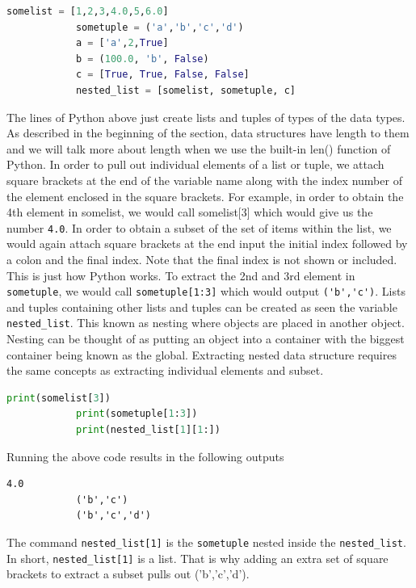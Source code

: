 \documentclass[11pt,a4paper]{book}
\begin{document}
			\begin{lstlisting}[language=Python, caption = Initialization of lists and tuples containing various data types.]
			somelist = [1,2,3,4.0,5,6.0]
			sometuple = ('a','b','c','d')
			a = ['a',2,True]
			b = (100.0, 'b', False)
			c = [True, True, False, False]
			nested_list = [somelist, sometuple, c]
			\end{lstlisting}
			
			The lines of Python above just create lists and tuples of types of the data types. As described in the beginning of the section, data structures have length to them and we will talk more about length when we use the built-in len() function of Python. In order to pull out individual elements of a list or tuple, we attach square brackets at the end of the variable name along with the index number of the element enclosed in the square brackets. For example, in order to obtain the 4th element in somelist, we would call somelist[3] which would give us the number \lstinline|4.0|. In order to obtain a subset of the set of items within the list, we would again attach square brackets at the end input the initial index followed by a colon and the final index. Note that the final index is not shown or included. This is just how Python works. To extract the 2nd and 3rd element in \lstinline|sometuple|, we would call \lstinline|sometuple[1:3]| which would output \lstinline|('b','c')|. Lists and tuples containing other lists and tuples can be created as seen the variable \lstinline|nested_list|. This known as nesting where objects are placed in another object. Nesting can be thought of as putting an object into a container with the biggest container being known as the global. Extracting nested data structure requires the same concepts as extracting individual elements and subset. 
			
			\begin{lstlisting}[language=Python, caption = Printing elements and subsets of already defined lists]
			print(somelist[3])
			print(sometuple[1:3])
			print(nested_list[1][1:])
			\end{lstlisting}
			\noindent Running the above code results in the following outputs
			\begin{lstlisting}[caption = The printed outputs of the elements and subset of somelist and sometupple]
			4.0
			('b','c')
			('b','c','d')
			\end{lstlisting}
			The command \lstinline|nested_list[1]| is the \lstinline|sometuple| nested inside the \lstinline|nested_list|. In short, \lstinline|nested_list[1]| is a list. That is why adding an extra set of square brackets to extract a subset pulls out ('b','c','d').
			
\end{document}
